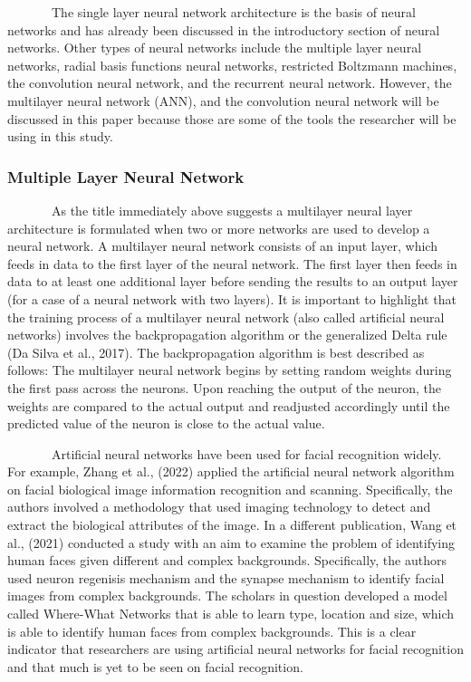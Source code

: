 \documentclass[
  12pt,
]{article}
\begin{document}
~~~~~~~The single layer neural network architecture is the basis of
neural networks and has already been discussed in the introductory
section of neural networks. Other types of neural networks include the
multiple layer neural networks, radial basis functions neural networks,
restricted Boltzmann machines, the convolution neural network, and the
recurrent neural network. However, the multilayer neural network (ANN),
and the convolution neural network will be discussed in this paper
because those are some of the tools the researcher will be using in this
study.

\subsubsection{Multiple Layer Neural
Network}\label{multiple-layer-neural-network}

~~~~~~~As the title immediately above suggests a multilayer neural layer
architecture is formulated when two or more networks are used to develop
a neural network. A multilayer neural network consists of an input
layer, which feeds in data to the first layer of the neural network. The
first layer then feeds in data to at least one additional layer before
sending the results to an output layer (for a case of a neural network
with two layers). It is important to highlight that the training process
of a multilayer neural network (also called artificial neural networks)
involves the backpropagation algorithm or the generalized Delta rule (Da
Silva et al., 2017). The backpropagation algorithm is best described as
follows: The multilayer neural network begins by setting random weights
during the first pass across the neurons. Upon reaching the output of
the neuron, the weights are compared to the actual output and readjusted
accordingly until the predicted value of the neuron is close to the
actual value.

~~~~~~~Artificial neural networks have been used for facial recognition
widely. For example, Zhang et al., (2022) applied the artificial neural
network algorithm on facial biological image information recognition and
scanning. Specifically, the authors involved a methodology that used
imaging technology to detect and extract the biological attributes of
the image. In a different publication, Wang et al., (2021) conducted a
study with an aim to examine the problem of identifying human faces
given different and complex backgrounds. Specifically, the authors used
neuron regenisis mechanism and the synapse mechanism to identify facial
images from complex backgrounds. The scholars in question developed a
model called Where-What Networks that is able to learn type, location
and size, which is able to identify human faces from complex
backgrounds. This is a clear indicator that researchers are using
artificial neural networks for facial recognition and that much is yet
to be seen on facial recognition.
\end{document}

